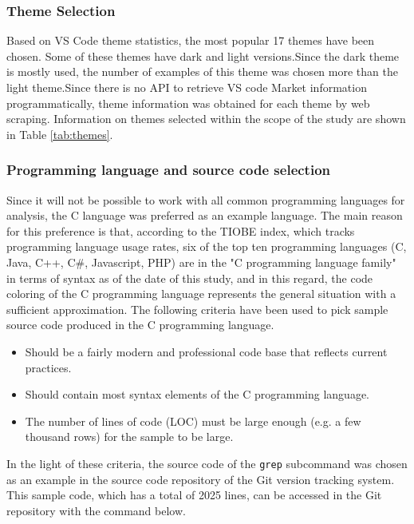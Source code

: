 \documentclass{article}
\begin{document}
\subsubsection{Theme Selection} \label{sec:material-methods.inputs.themes}

Based on VS Code theme statistics\cite{vs2022thememarket}, the most popular 17 themes have been chosen. Some of these
themes have dark and light versions.Since the dark theme is mostly used\cite{sarath2016prefer}, the number of examples
of this theme was chosen more than the light theme.Since there is no API to retrieve VS code Market information
programmatically, theme information was obtained for each theme by web scraping. Information on themes selected within
the scope of the study are shown in Table \ref{tab:themes}. 

\subsubsection{Programming language and source code selection} \label{sec:material-methods.inputs.language}

Since it will not be possible to work with all common programming languages for analysis, the C language was preferred as an example language. The main reason for this preference is that, according to the TIOBE index, which tracks programming language usage rates, six of the top ten programming languages (C, Java, C++, C\#, Javascript, PHP) are in the "C programming language family" in terms of syntax as of the date of this study\cite{tiobe2022index}, and in this regard, the code coloring of the C programming language represents the general situation with a sufficient approximation. The following criteria have been used to pick sample source code produced in the C programming language.

\begin{itemize}
  \item Should be a fairly modern and professional code base that reflects current practices.

  \item Should contain most syntax elements of the C programming language.

  \item The number of lines of code (LOC) must be large enough (e.g. a few thousand rows) for the sample to be large.
\end{itemize}

In the light of these criteria, the source code\cite{github2022gitgrep} of the \texttt{grep} subcommand\cite{git2022grep} was chosen as an example in the source code repository\cite{github2022gitrepo} of the Git\cite{git2022homepage} version tracking system. This sample code, which has a total of 2025 lines, can be accessed in the Git repository with the command below.
\end{document}

